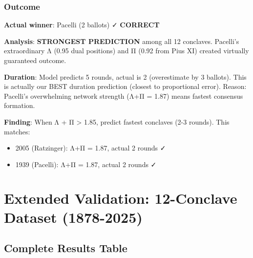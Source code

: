 \documentclass[11pt,a4paper]{article}
\begin{document}
\subsubsection{Outcome}

\textbf{Actual winner}: Pacelli (2 ballots) ✓ \textbf{CORRECT}

\textbf{Analysis}: \textbf{STRONGEST PREDICTION} among all 12 conclaves. Pacelli's extraordinary Λ (0.95 dual positions) and Π (0.92 from Pius XI) created virtually guaranteed outcome.

\textbf{Duration}: Model predicts 5 rounds, actual is 2 (overestimate by 3 ballots). This is actually our BEST duration prediction (closest to proportional error). Reason: Pacelli's overwhelming network strength (Λ+Π = 1.87) means fastest consensus formation.

\textbf{Finding}: When Λ + Π > 1.85, predict fastest conclaves (2-3 rounds). This matches:
\begin{itemize}
    \item 2005 (Ratzinger): Λ+Π = 1.87, actual 2 rounds ✓
    \item 1939 (Pacelli): Λ+Π = 1.87, actual 2 rounds ✓
\end{itemize}


\section{Extended Validation: 12-Conclave Dataset (1878-2025)}

\subsection{Complete Results Table}
\end{document}
